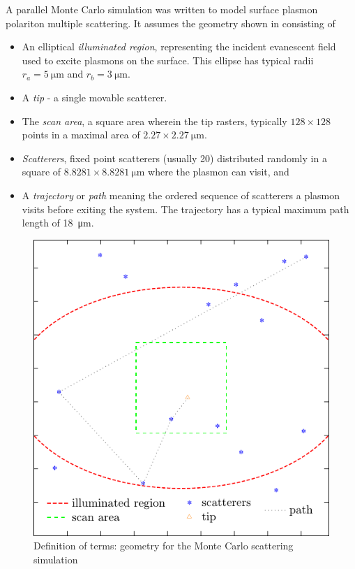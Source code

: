 A parallel Monte Carlo simulation was written to model surface plasmon
polariton multiple scattering.
It assumes the geometry shown in  consisting of
\begin{itemize}
\item An elliptical {\it illuminated region}, representing the incident evanescent
field used to excite plasmons on the surface.  This ellipse has 
typical radii $r_a=\SI{5}{\micro\meter}$ and $r_b=\SI{3}{\micro\meter}$.  
\item A {\it tip} - a single movable scatterer.
\item The {\it scan area}, a square area wherein the tip rasters, typically
$128\times128$ points in a maximal area of $2.27\times\SI{2.27}{\micro\meter}$.  
\item {\it Scatterers}, fixed point scatterers (usually \num{20})
distributed randomly in a square of $8.8281\times\SI{8.8281}{\micro\meter}$
where the plasmon can visit, and
\item A {\it trajectory} or {\it path} meaning the ordered sequence of scatterers a
plasmon visits before exiting the system.  The trajectory has a typical maximum
path length of \SI{18}{\micro\meter}.
\end{itemize}
\begin{figure}[ht]
\centering
\includegraphics[keepaspectratio]{scatteringmicro/figures/montecarlogeo.pdf}
\caption{Definition of terms: geometry for the Monte Carlo scattering
simulation}
\label{fig:plasmongeo}
\end{figure}

